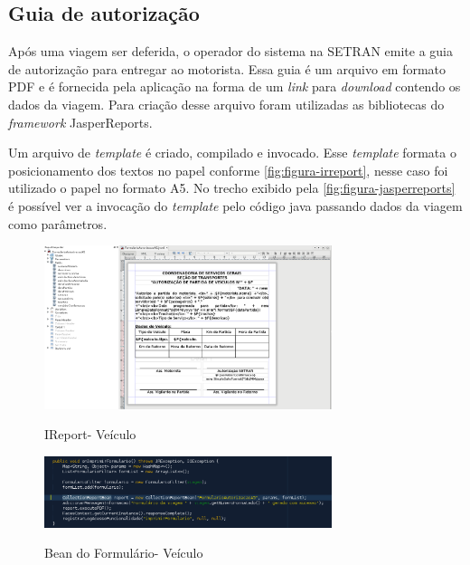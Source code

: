 \subsection{Guia de autorização}
\label{sbs:desenvolvimentoJasper}

Após uma viagem ser deferida, o operador do sistema na SETRAN emite a guia de autorização para entregar ao motorista. Essa guia é um arquivo em formato PDF e é fornecida pela aplicação na forma de um \textit{link} para \textit{download} contendo os dados da viagem. Para criação desse arquivo foram utilizadas as bibliotecas do \textit{framework} JasperReports. 

Um arquivo de \textit{template} é criado, compilado e invocado. Esse \textit{template} formata o posicionamento dos textos no papel conforme \autoref{fig:figura-irreport}, nesse caso foi utilizado o papel no formato A5.
No trecho exibido pela \autoref{fig:figura-jasperreports} é possível ver a invocação do \textit{template} pelo código java passando dados da viagem como parâmetros.

\begin{figure}[!htb]
    \centering
    \caption{IReport- Veículo}
    \includegraphics[width=0.75\textwidth]{dados/figuras/veiculos-ireport.png}
    \label{fig:figura-irreport}
\end{figure}

\begin{figure}[!htb]
    \centering
    \caption{Bean do Formulário- Veículo}
    \includegraphics[width=0.75\textwidth]{dados/figuras/veiculos-jasperreports.png}
    \label{fig:figura-jasperreports}
\end{figure}


